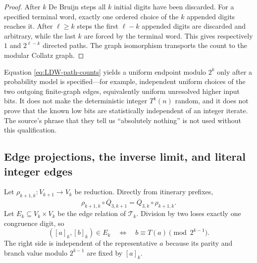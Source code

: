 \begin{proof}
After $k$ De Bruijn steps all $k$ initial digits have been discarded.  For a
specified terminal word, exactly one ordered choice of the $k$ appended
digits reaches it.  After $\ell\geq k$ steps the first $\ell-k$ appended
digits are discarded and arbitrary, while the last $k$ are forced by the
terminal word.  This gives respectively $1$ and $2^{\ell-k}$ directed paths.
The graph isomorphism transports the count to the modular Collatz graph.
\end{proof}

\begin{nonclaim}
Equation \eqref{eq:LDW-path-counts} yields a uniform endpoint modulo $2^k$
only after a probability model is specified---for example, independent
uniform choices of the two outgoing finite-graph edges, equivalently uniform
unresolved higher input bits.  It does not make the deterministic integer
$T^k(n)$ random, and it does not prove that the known low bits are
statistically independent of an integer iterate.  The source's phrase that
they tell us ``absolutely nothing'' is not used without this qualification.
\end{nonclaim}

\subsection{Edge projections, the inverse limit, and literal integer edges}

Let $\rho_{k+1,k}:V_{k+1}\to V_k$ be reduction.  Directly from itinerary
prefixes,
\begin{equation}
\label{eq:LDW-projective-encoder}
 \rho_{k+1,k}\circ\overline Q_{3,k+1}
 =\overline Q_{3,k}\circ\rho_{k+1,k}.
\end{equation}
Let $E_k\subseteq V_k\times V_k$ be the edge relation of $\mathcal T_k$.
Division by two loses exactly one congruence digit, so
\begin{equation}
\label{eq:LDW-edge-lower-precision}
 ([a]_k,[b]_k)\in E_k
 \quad\Longleftrightarrow\quad
 b\equiv T(a)\pmod{2^{k-1}}.
\end{equation}
The right side is independent of the representative $a$ because its parity
and branch value modulo $2^{k-1}$ are fixed by $[a]_k$.

